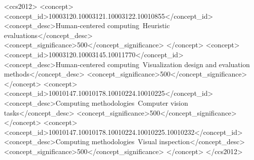 \documentclass[sigconf]{acmart}
\begin{document}
\begin{abstract}
  Judging the similarity of visualizations is crucial to various applications, such as visualization-based search and visualization recommendation systems. Recent studies show deep-feature-based similarity metrics correlate well with perceptual judgments of image similarity and serve as effective loss functions for tasks like image super-resolution and style transfer. We explore the application of such metrics to judgments of visualization similarity. We extend a similarity metric using five ML architectures and three pre-trained weight sets. We replicate results from previous crowdsourced studies on scatterplot and visual channel similarity perception. Notably, our metric using pre-trained ImageNet weights outperformed gradient-descent tuned MS-SSIM, a multi-scale similarity metric based on luminance, contrast, and structure. Our work contributes to understanding how deep-feature-based metrics can enhance similarity assessments in visualization, potentially improving visual analysis tools and techniques. Supplementary materials are available at \url{https://osf.io/dj2ms/}.
\end{abstract}

\begin{CCSXML}
<ccs2012>
   <concept>
       <concept_id>10003120.10003121.10003122.10010855</concept_id>
       <concept_desc>Human-centered computing~Heuristic evaluations</concept_desc>
       <concept_significance>500</concept_significance>
       </concept>
   <concept>
       <concept_id>10003120.10003145.10011770</concept_id>
       <concept_desc>Human-centered computing~Visualization design and evaluation methods</concept_desc>
       <concept_significance>500</concept_significance>
       </concept>
   <concept>
       <concept_id>10010147.10010178.10010224.10010225</concept_id>
       <concept_desc>Computing methodologies~Computer vision tasks</concept_desc>
       <concept_significance>500</concept_significance>
       </concept>
   <concept>
       <concept_id>10010147.10010178.10010224.10010225.10010232</concept_id>
       <concept_desc>Computing methodologies~Visual inspection</concept_desc>
       <concept_significance>500</concept_significance>
       </concept>
 </ccs2012>
\end{CCSXML}
\end{document}

